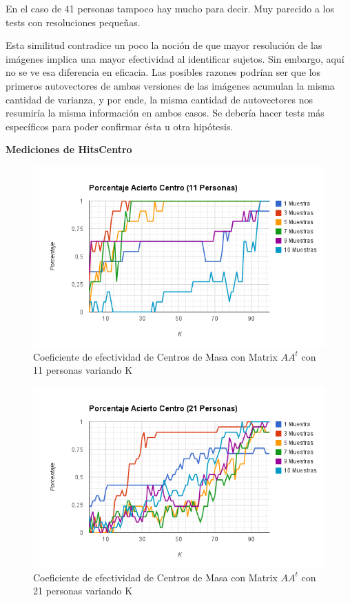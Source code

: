 En el caso de 41 personas tampoco hay mucho para decir. Muy parecido a los tests 
con resoluciones pequeñas.

Esta similitud contradice un poco la noción de que mayor resolución de las imágenes implica una
mayor efectividad al identificar sujetos. Sin embargo, aquí no se ve esa diferencia en eficacia. Las
posibles razones podrían ser que los primeros autovectores de ambas versiones de las imágenes
acumulan la misma cantidad de varianza, y por ende, la misma cantidad de autovectores nos resumiría
la misma información en ambos casos. Se debería hacer tests más específicos para poder confirmar
ésta u otra hipótesis.

\newpage

\textbf{Mediciones de HitsCentro }

\begin{figure}[H] \includegraphics[width=1\textwidth]{img/imagef13.png} \caption{Coeficiente de
    efectividad de Centros de Masa con Matrix $AA^t$ con 11 personas variando K} \end{figure}

\begin{figure}[H] \includegraphics[width=1\textwidth]{img/imagef14.png} \caption{Coeficiente de
    efectividad de Centros de Masa con Matrix $AA^t$ con 21 personas variando K} \end{figure}

